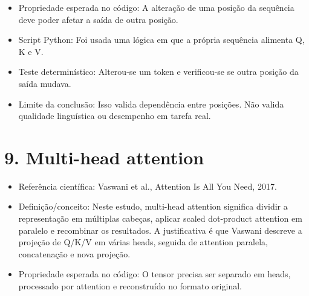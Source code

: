 \begin{itemize}
\item Propriedade esperada no código:
A alteração de uma posição da sequência deve poder afetar a saída de outra
posição.
\end{itemize}

\begin{itemize}
\item Script Python:
Foi usada uma lógica em que a própria sequência alimenta Q, K e V.
\end{itemize}

\begin{itemize}
\item Teste determinístico:
Alterou-se um token e verificou-se se outra posição da saída mudava.
\end{itemize}

\begin{itemize}
\item Limite da conclusão:
Isso valida dependência entre posições. Não valida qualidade linguística ou
desempenho em tarefa real.
\end{itemize}



\section{9. Multi-head attention}


\begin{itemize}
\item Referência científica:
Vaswani et al., Attention Is All You Need, 2017.
\end{itemize}

\begin{itemize}
\item Definição/conceito:
Neste estudo, multi-head attention significa dividir a representação em
múltiplas cabeças, aplicar scaled dot-product attention em paralelo e
recombinar os resultados. A justificativa é que Vaswani descreve a projeção de
Q/K/V em várias heads, seguida de attention paralela, concatenação e nova
projeção.
\end{itemize}

\begin{itemize}
\item Propriedade esperada no código:
O tensor precisa ser separado em heads, processado por attention e reconstruído
no formato original.
\end{itemize}

